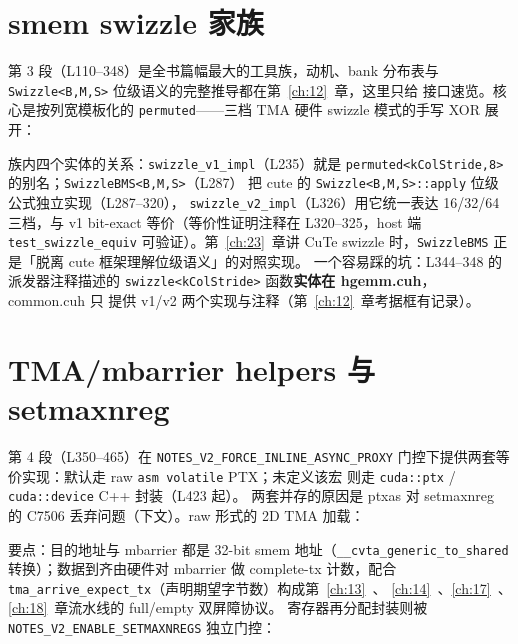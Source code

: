 \section{smem swizzle 家族}

第 3 段（L110--348）是全书篇幅最大的工具族，动机、bank 分布表与
\texttt{Swizzle\allowbreak{}<B,\allowbreak{}M,\allowbreak{}S>} 位级语义的完整推导都在第~\ref{ch:12}~章，这里只给
接口速览。核心是按列宽模板化的 \texttt{permuted}——三档 TMA 硬件 swizzle
模式的手写 XOR 展开：



族内四个实体的关系：\texttt{swizzle\_\allowbreak{}v1\_\allowbreak{}impl}（L235）就是
\texttt{permuted\allowbreak{}<k\allowbreak{}Col\allowbreak{}Stride,\allowbreak{}8>} 的别名；\texttt{Swizzle\allowbreak{}BMS\allowbreak{}<B,\allowbreak{}M,\allowbreak{}S>}（L287）
把 cute 的 \texttt{Swizzle\allowbreak{}<B,\allowbreak{}M,\allowbreak{}S>::\allowbreak{}apply} 位级公式独立实现（L287--320），
\texttt{swizzle\_\allowbreak{}v2\_\allowbreak{}impl}（L326）用它统一表达 16/32/64 三档，与 v1
bit-exact 等价（等价性证明注释在 L320--325，host 端
\texttt{test\_\allowbreak{}swizzle\_\allowbreak{}equiv} 可验证）。第~\ref{ch:23}~章讲 CuTe swizzle
时，\texttt{SwizzleBMS} 正是「脱离 cute 框架理解位级语义」的对照实现。
一个容易踩的坑：L344--348 的派发器注释描述的
\texttt{swizzle\allowbreak{}<k\allowbreak{}Col\allowbreak{}Stride>} 函数\textbf{实体在 hgemm.cuh}，common.cuh 只
提供 v1/v2 两个实现与注释（第~\ref{ch:12}~章考据框有记录）。

\section{TMA/mbarrier helpers 与 setmaxnreg}

第 4 段（L350--465）在 \texttt{NOTES\_\allowbreak{}V2\_\allowbreak{}FORCE\_\allowbreak{}INLINE\_\allowbreak{}ASYNC\_\allowbreak{}PROXY}
门控下提供两套等价实现：默认走 raw \texttt{asm volatile} PTX；未定义该宏
则走 \texttt{cuda::ptx} / \texttt{cuda::\allowbreak{}device} C++ 封装（L423 起）。
两套并存的原因是 ptxas 对 setmaxnreg 的 C7506 丢弃问题（下文）。raw 形式的
2D TMA 加载：



要点：目的地址与 mbarrier 都是 32-bit smem 地址（\texttt{\_\allowbreak{}\_\allowbreak{}cvta\_\allowbreak{}generic\_\allowbreak{}to\_\allowbreak{}shared}
转换）；数据到齐由硬件对 mbarrier 做 complete-tx 计数，配合
\texttt{tma\_\allowbreak{}arrive\_\allowbreak{}expect\_\allowbreak{}tx}（声明期望字节数）构成第~\ref{ch:13}~、
\ref{ch:14}~、\ref{ch:17}~、\ref{ch:18}~章流水线的 full/empty 双屏障协议。
寄存器再分配封装则被 \texttt{NOTES\_\allowbreak{}V2\_\allowbreak{}ENABLE\_\allowbreak{}SETMAXNREGS} 独立门控：

